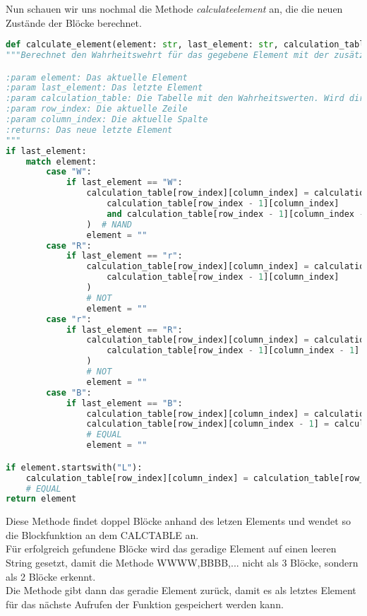\documentclass[a4paper,10pt,ngerman]{scrartcl}
\begin{document}
Nun schauen wir uns nochmal die Methode \emph{calculate\textunderscore element} an, die die neuen Zustände der Blöcke berechnet.
\begin{lstlisting}[language=Python]
def calculate_element(element: str, last_element: str, calculation_table, row_index, column_index):
"""Berechnet den Wahrheitswehrt für das gegebene Element mit der zusätzlichen Information des letzten Elements. Speichert den Wahrheitswert in calculation_table und gibt das neue letzte Element zurück

:param element: Das aktuelle Element
:param last_element: Das letzte Element
:param calculation_table: Die Tabelle mit den Wahrheitswerten. Wird direkt verändert
:param row_index: Die aktuelle Zeile
:param column_index: Die aktuelle Spalte
:returns: Das neue letzte Element
"""
if last_element:
    match element:
        case "W":
            if last_element == "W":
                calculation_table[row_index][column_index] = calculation_table[row_index][column_index - 1] = not (
                    calculation_table[row_index - 1][column_index]
                    and calculation_table[row_index - 1][column_index - 1]
                )  # NAND
                element = ""
        case "R":
            if last_element == "r":
                calculation_table[row_index][column_index] = calculation_table[row_index][column_index - 1] = not (
                    calculation_table[row_index - 1][column_index]
                )
                # NOT
                element = ""
        case "r":
            if last_element == "R":
                calculation_table[row_index][column_index] = calculation_table[row_index][column_index - 1] = not (
                    calculation_table[row_index - 1][column_index - 1]
                )
                # NOT
                element = ""
        case "B":
            if last_element == "B":
                calculation_table[row_index][column_index] = calculation_table[row_index - 1][column_index]
                calculation_table[row_index][column_index - 1] = calculation_table[row_index - 1][column_index - 1]
                # EQUAL
                element = ""

if element.startswith("L"):
    calculation_table[row_index][column_index] = calculation_table[row_index - 1][column_index]
    # EQUAL
return element
\end{lstlisting}
Diese Methode findet doppel Blöcke anhand des letzen Elements und wendet so die Blockfunktion an dem CALC\textunderscore TABLE an.\\
Für erfolgreich gefundene Blöcke wird das geradige Element auf einen leeren String gesetzt, damit die Methode WWWW,BBBB,... nicht als 3 Blöcke, sondern als 2 Blöcke erkennt.\\
Die Methode gibt dann das geradie Element zurück, damit es als letztes Element für das nächste Aufrufen der Funktion gespeichert werden kann.\\
\end{document}

